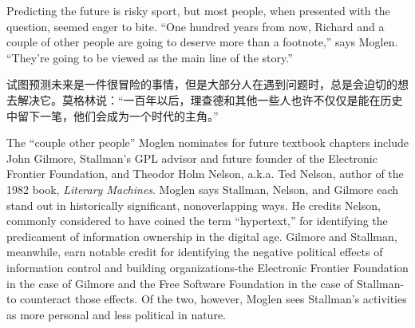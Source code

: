 \ifdefined\eng
Predicting the future is risky sport, but most people, when presented with the question, seemed eager to bite. ``One hundred years from now, Richard and a couple of other people are going to deserve more than a footnote,'' says Moglen. ``They're going to be viewed as the main line of the story.''
\fi

\ifdefined\chs
试图预测未来是一件很冒险的事情，但是大部分人在遇到问题时，总是会迫切的想去解决它。莫格林说：``一百年以后，理查德和其他一些人也许不仅仅是能在历史中留下一笔，他们会成为一个时代的主角。''
\fi

\ifdefined\eng
The ``couple other people'' Moglen nominates for future textbook chapters include John Gilmore, Stallman's GPL advisor and future founder of the Electronic Frontier Foundation, and Theodor Holm Nelson, a.k.a. Ted Nelson, author of the 1982 book, \textit{Literary Machines}. Moglen says Stallman, Nelson, and Gilmore each stand out in historically significant, nonoverlapping ways. He credits Nelson, commonly considered to have coined the term ``hypertext,'' for identifying the predicament of information ownership in the digital age. Gilmore and Stallman, meanwhile, earn notable credit for identifying the negative political effects of information control and building organizations-the Electronic Frontier Foundation in the case of Gilmore and the Free Software Foundation in the case of Stallman-to counteract those effects. Of the two, however, Moglen sees Stallman's activities as more personal and less political in nature.

\fi

